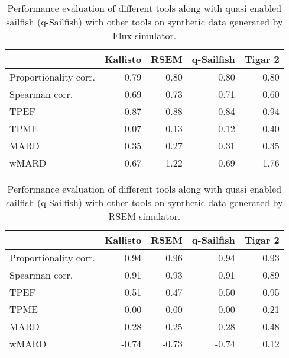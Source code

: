 \begin{table*}[hbtp]
\centering
\caption{Performance evaluation of different tools along with quasi enabled sailfish (q-Sailfish) with other tools on synthetic data generated by Flux simulator.}
\label{tab:quant_perf_tpm_flux}
\begin{tabulary}{2cm}{lrrrr}
\toprule	
{} &  Kallisto &  RSEM &  q-Sailfish &  Tigar 2 \\
\midrule
Proportionality corr. &      0.79 &          0.80 &              0.80 &   0.80\\
Spearman corr.        &      0.69 &          0.73 &              0.71 &   0.60\\
TPEF 		      &      0.87 &          0.88 &              0.84 &   0.94\\
TPME 		      &      0.07 &          0.13 &              0.12 &  -0.40\\
MARD    	      &      0.35 &          0.27 &              0.31 &   0.35\\
wMARD 		      &      0.67 &          1.22 &              0.69 &   1.76\\
\bottomrule
\end{tabulary}
\end{table*}

\begin{table*}[hbtp]
\centering
\caption{Performance evaluation of different tools along with quasi enabled sailfish (q-Sailfish) with other tools on synthetic data generated by RSEM simulator.}
\label{tab:quant_perf_tpm_rsem}
\begin{tabulary}{2cm}{lrrrr}
\toprule	
{} &  Kallisto &  RSEM &  q-Sailfish &  Tigar 2 \\
\midrule
Proportionality corr. &0.94 &          0.96 &              0.94 &   0.93 \\
Spearman corr.        &0.91 &          0.93 &              0.91 &   0.89 \\
TPEF 		      &0.51 &          0.47 &              0.50 &   0.95 \\
TPME 		      &0.00 &          0.00 &              0.00 &   0.21 \\
MARD    	      &0.28 &          0.25 &              0.28 &   0.48 \\
wMARD 		      &-0.74 &         -0.73 &             -0.74 &   0.12 \\
\bottomrule
\end{tabulary}
\end{table*}

